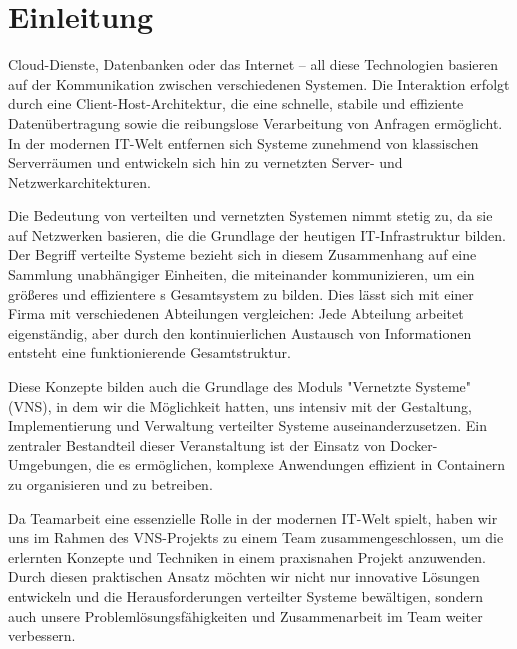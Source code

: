 \section{Einleitung}\label{einleitung}

Cloud-Dienste, Datenbanken oder das Internet – all diese Technologien basieren auf der Kommunikation zwischen verschiedenen Systemen. Die Interaktion erfolgt durch eine Client-Host-Architektur, die eine schnelle, stabile und effiziente Datenübertragung sowie die reibungslose Verarbeitung von Anfragen ermöglicht. In der modernen IT-Welt entfernen sich Systeme zunehmend von klassischen Serverräumen und entwickeln sich hin zu vernetzten Server- und Netzwerkarchitekturen. 

Die Bedeutung von verteilten und vernetzten Systemen nimmt stetig zu, da sie auf Netzwerken basieren, die die Grundlage der heutigen IT-Infrastruktur bilden. Der Begriff verteilte Systeme bezieht sich in diesem Zusammenhang auf eine Sammlung unabhängiger Einheiten, die miteinander kommunizieren, um ein größeres und effizientere	s Gesamtsystem zu bilden. Dies lässt sich mit einer Firma mit verschiedenen Abteilungen vergleichen: Jede Abteilung arbeitet eigenständig, aber durch den kontinuierlichen Austausch von Informationen entsteht eine funktionierende Gesamtstruktur. 

Diese Konzepte bilden auch die Grundlage des Moduls "Vernetzte Systeme" (VNS), in dem wir die Möglichkeit hatten, uns intensiv mit der Gestaltung, Implementierung und Verwaltung verteilter Systeme auseinanderzusetzen. Ein zentraler Bestandteil dieser Veranstaltung ist der Einsatz von Docker-Umgebungen, die es ermöglichen, komplexe Anwendungen effizient in Containern zu organisieren und zu betreiben. 

Da Teamarbeit eine essenzielle Rolle in der modernen IT-Welt spielt, haben wir uns im Rahmen des VNS-Projekts zu einem Team zusammengeschlossen, um die erlernten Konzepte und Techniken in einem praxisnahen Projekt anzuwenden. Durch diesen praktischen Ansatz möchten wir nicht nur innovative Lösungen entwickeln und die Herausforderungen verteilter Systeme bewältigen, sondern auch unsere Problemlösungsfähigkeiten und Zusammenarbeit im Team weiter verbessern.

